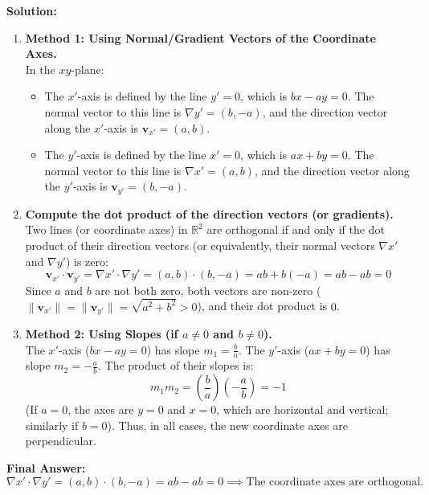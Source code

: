 \documentclass[11pt]{article}
\begin{document}
\textbf{Solution:}
\begin{enumerate}[label=\textbf{Step \arabic*:}]
    \item \textbf{Method 1: Using Normal/Gradient Vectors of the Coordinate Axes.} \\
    In the $xy$-plane:
    \begin{itemize}
        \item The $x'$-axis is defined by the line $y' = 0$, which is $bx - ay = 0$. The normal vector to this line is $\nabla y' = (b, -a)$, and the direction vector along the $x'$-axis is $\mathbf{v}_{x'} = (a, b)$.
        \item The $y'$-axis is defined by the line $x' = 0$, which is $ax + by = 0$. The normal vector to this line is $\nabla x' = (a, b)$, and the direction vector along the $y'$-axis is $\mathbf{v}_{y'} = (b, -a)$.
    \end{itemize}

    \item \textbf{Compute the dot product of the direction vectors (or gradients).} \\
    Two lines (or coordinate axes) in $\mathbb{R}^2$ are orthogonal if and only if the dot product of their direction vectors (or equivalently, their normal vectors $\nabla x'$ and $\nabla y'$) is zero:
    \[
    \mathbf{v}_{x'} \cdot \mathbf{v}_{y'} = \nabla x' \cdot \nabla y' = (a, b) \cdot (b, -a) = ab + b(-a) = ab - ab = 0
    \]
    Since $a$ and $b$ are not both zero, both vectors are non-zero ($\|\mathbf{v}_{x'}\| = \|\mathbf{v}_{y'}\| = \sqrt{a^2 + b^2} > 0$), and their dot product is $0$.

    \item \textbf{Method 2: Using Slopes (if $a \neq 0$ and $b \neq 0$).} \\
    The $x'$-axis ($bx - ay = 0$) has slope $m_1 = \frac{b}{a}$. The $y'$-axis ($ax + by = 0$) has slope $m_2 = -\frac{a}{b}$. The product of their slopes is:
    \[
    m_1 m_2 = \left(\frac{b}{a}\right)\left(-\frac{a}{b}\right) = -1
    \]
    (If $a = 0$, the axes are $y = 0$ and $x = 0$, which are horizontal and vertical; similarly if $b = 0$). Thus, in all cases, the new coordinate axes are perpendicular.
\end{enumerate}

\noindent\textbf{Final Answer:}
\[
\boxed{\nabla x' \cdot \nabla y' = (a, b) \cdot (b, -a) = ab - ab = 0 \implies \text{The coordinate axes are orthogonal.}}
\]

\hrulefill
\end{document}
